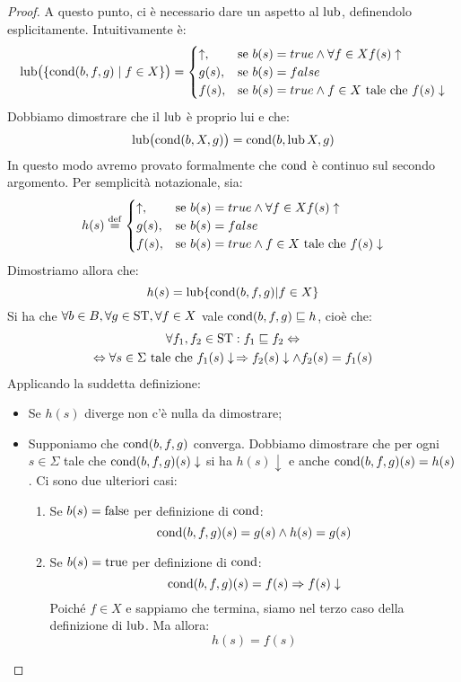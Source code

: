 \begin{proof}
A questo punto, ci è necessario dare un aspetto al $\mathop{\mathrm{lub}}\nolimits$,
definendolo esplicitamente. Intuitivamente è:
\[
  \mathop{\mathrm{lub}}\nolimits\bigl( \{ \mathrm{cond}(b,f,g) \; | \; f \in X \}\bigr)=
  \begin{cases}
    \uparrow , & \textrm{se } b(s)=true \land \forall f \in X f(s) \uparrow \\
    g(s), & \textrm{se } b(s)=false \\
    f(s), & \textrm{se } b(s)=true \land f \in X \textrm{ tale che } f(s) \downarrow
  \end{cases}
\]
Dobbiamo dimostrare che il $\mathop{\mathrm{lub}}\nolimits$ è proprio lui e che:
\[
  \mathop{\mathrm{lub}}\nolimits \bigl(\mathrm{cond}(b,X,g)\bigr) = \mathrm{cond}(b, \mathop{\mathrm{lub}}\nolimits X, g)
\]
In questo modo avremo provato formalmente che $\mathrm{cond}$ è continuo
sul secondo argomento. 
Per semplicità notazionale, sia:
\[
  h(s) \defeq
  \begin{cases}
    \uparrow , & \textrm{se } b(s)=true \land \forall f \in X f(s) \uparrow \\
    g(s), & \textrm{se } b(s)=false \\
    f(s), & \textrm{se } b(s)=true \land f \in X \textrm{ tale che } f(s) \downarrow
  \end{cases}
\]
Dimostriamo allora che:
\[
  h(s) = \mathop{\mathrm{lub}}\nolimits \{\mathrm{cond}(b,f,g) | f \in X \}
\]
Si ha che $\forall b \in B, \forall g \in \mathrm{ST}, \forall f \in X$
vale $\mathrm{cond}(b,f,g) \sqsubseteq h $, cioè che:
\begin{multline*}
  \forall f_1, f_2 \in \mathrm{ST} : f_1 \sqsubseteq f_2 \Leftrightarrow \\
  \Leftrightarrow \forall s \in \Sigma \textrm{ tale che } f_{1}(s) \downarrow
  \, \Rightarrow f_{2}(s) \downarrow \land f_{2}(s) = f_{1}(s)
\end{multline*}
Applicando la suddetta definizione:
\begin{itemize}
  \item Se $h(s)$ diverge non c'è nulla da dimostrare;
  \item Supponiamo che $\mathrm{cond}(b,f,g)$ converga. Dobbiamo dimostrare che
    per ogni $s \in \Sigma$ tale che $\mathrm{cond}(b,f,g)(s) \downarrow$
    si ha $h(s) \downarrow$ e  anche $\mathrm{cond}(b,f,g)(s) = h(s)$.
  Ci sono due ulteriori casi:
  \begin{enumerate}
    \item Se $b(s) = \mathrm{false}$ per definizione di $\mathrm{cond}$:
    \[ \mathrm{cond}(b,f,g)(s) = g(s) \land h(s) = g(s) \]
    \item Se $b(s) = \mathrm{true}$ per definizione di $\mathrm{cond}$:
    \[ \mathrm{cond}(b,f,g)(s) = f(s) \Rightarrow f(s) \downarrow \]
    Poiché $f \in X$ e sappiamo che termina, siamo nel terzo caso della
    definizione di $\mathop{\mathrm{lub}}\nolimits$. Ma allora:
    \[ h(s) = f(s) \]
   \end{enumerate}
\end{itemize}


\end{proof}
